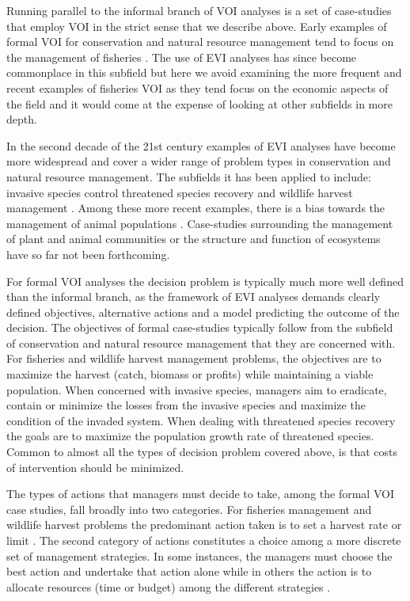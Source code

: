 \documentclass[]{article}
\theoremstyle{definition}
\theoremstyle{definition}
\theoremstyle{definition}
\theoremstyle{remark}
\begin{document}
Running parallel to the informal branch of VOI analyses is a set of
case-studies that employ VOI in the strict sense that we describe above.
Early examples of formal VOI for conservation and natural resource
management tend to focus on the management of fisheries
\citetext{\citealp[e.g.,][]{Walters1986}; \citealp[\citet{Mantyniemi2009}]{Kuikka1999}; \citealp{Costello2010}}.
The use of EVI analyses has since become commonplace in this subfield
but here we avoid examining the more frequent and recent examples of
fisheries VOI as they tend focus on the economic aspects of the field
and it would come at the expense of looking at other subfields in more
depth.

In the second decade of the 21st century examples of EVI analyses have
become more widespread and cover a wider range of problem types in
conservation and natural resource management. The subfields it has been
applied to include: invasive species control
\citep[e.g.,][]{Moore2011, Moore2012} threatened species recovery
\citep[e.g.,][]{Runge2011a, Canessa2015, Maxwell2015} and wildlife
harvest management
\citep[e.g.,][]{Johnson2014a, Johnson2014b, Williams2015, Robinson2016}.
Among these more recent examples, there is a bias towards the management
of animal populations \citep[ being the only examples dealing with
plants]{Moore2011, Moore2012}. Case-studies surrounding the management
of plant and animal communities or the structure and function of
ecosystems have so far not been forthcoming.

For formal VOI analyses the decision problem is typically much more well
defined than the informal branch, as the framework of EVI analyses
demands clearly defined objectives, alternative actions and a model
predicting the outcome of the decision. The objectives of formal
case-studies typically follow from the subfield of conservation and
natural resource management that they are concerned with. For fisheries
and wildlife harvest management problems, the objectives are to maximize
the harvest (catch, biomass or profits) while maintaining a viable
population. When concerned with invasive species, managers aim to
eradicate, contain or minimize the losses from the invasive species and
maximize the condition of the invaded system. When dealing with
threatened species recovery the goals are to maximize the population
growth rate of threatened species. Common to almost all the types of
decision problem covered above, is that costs of intervention should be
minimized.

The types of actions that managers must decide to take, among the formal
VOI case studies, fall broadly into two categories. For fisheries
management and wildlife harvest problems the predominant action taken is
to set a harvest rate or limit
\citep[e.g.,][]{Kuikka1999, Mantyniemi2009, Costello2010, Johnson2014a, Williams2015}.
The second category of actions constitutes a choice among a more
discrete set of management strategies. In some instances, the managers
must choose the best action and undertake that action alone
\citep[e.g.,][]{Moore2011, Runge2011a, Johnson2014b, Canessa2015, Robinson2016}
while in others the action is to allocate resources (time or budget)
among the different strategies \citep[e.g.,][]{Moore2012, Maxwell2015}.
\end{document}
